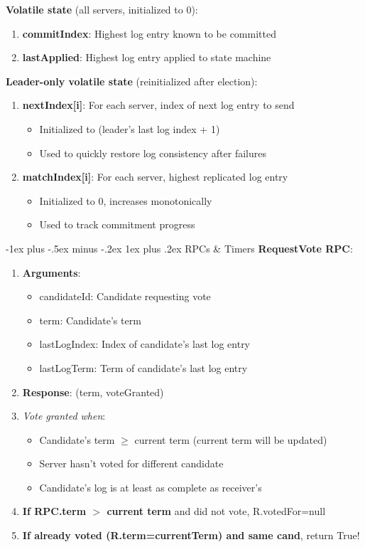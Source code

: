 \documentclass[8pt, landscape]{extarticle}
\makeatletter
\renewcommand{\subsubsection}{\@startsection{subsubsection}{3}{0mm}%
  {-1ex plus -.5ex minus -.2ex}%
  {1ex plus .2ex}%
{\normalfont\small\bfseries}}%
\makeatother
\begin{document}
\begin{multicols*}{4}
\textbf{Volatile state} (all servers, initialized to 0):
\begin{enumerate}
    \item \textbf{commitIndex}: Highest log entry known to be committed
    \item \textbf{lastApplied}: Highest log entry applied to state machine
\end{enumerate}

\textbf{Leader-only volatile state} (reinitialized after election):
\begin{enumerate}
    \item \textbf{nextIndex[i]}: For each server, index of next log entry to send
        \begin{itemize}
            \item Initialized to (leader's last log index + 1)
            \item Used to quickly restore log consistency after failures
        \end{itemize}
    \item \textbf{matchIndex[i]}: For each server, highest replicated log entry
        \begin{itemize}
            \item Initialized to 0, increases monotonically
            \item Used to track commitment progress
        \end{itemize}
\end{enumerate}

\subsubsection{RPCs \& Timers}
\textbf{RequestVote RPC}:
\begin{enumerate}
    \item \textbf{Arguments}:
    \begin{itemize}
        \item candidateId: Candidate requesting vote
        \item term: Candidate's term
        \item lastLogIndex: Index of candidate's last log entry
        \item lastLogTerm: Term of candidate's last log entry
    \end{itemize}
    \item \textbf{Response}: (term, voteGranted)
    \item \textit{Vote granted when}:
    \begin{itemize}
        \item Candidate's term $\geq$ current term (current term will be updated)
        \item Server hasn't voted for different candidate
        \item Candidate's log is at least as complete as receiver's
    \end{itemize}
    \item \textbf{If RPC.term $>$ current term} and did not vote, R.votedFor=null
    \item \textbf{If already voted (R.term=currentTerm) and same cand}, return True!
\end{enumerate}


\end{multicols*}
\end{document}
